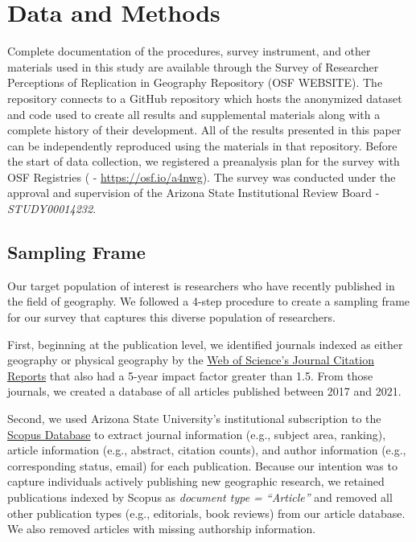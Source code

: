 \documentclass[]{interact}
\theoremstyle{plain}%
\theoremstyle{definition}
\theoremstyle{remark}
\begin{document}
\section*{Data and Methods}
Complete documentation of the procedures, survey instrument, and other materials used in this study are available through the Survey of Researcher Perceptions of Replication in Geography Repository (OSF WEBSITE).
The repository connects to a GitHub repository which hosts the anonymized dataset and code used to create all results and supplemental materials along with a complete history of their development. 
All of the results presented in this paper can be independently reproduced using the materials in that repository.
Before the start of data collection, we registered a preanalysis plan for the survey with OSF Registries (\citet{Kedron_RPl_Survey_PAP} - \url{https://osf.io/a4nwg}). 
The survey was conducted under the approval and supervision of the Arizona State Institutional Review Board - \textit{STUDY00014232}.

\subsection*{Sampling Frame}
Our target population of interest is researchers who have recently published in the field of geography. 
We followed a 4-step procedure to create a sampling frame for our survey that captures this diverse population of researchers. 

First, beginning at the publication level, we identified journals indexed as either geography or physical geography by the \href{https://access.clarivate.com/}{Web of Science's Journal Citation Reports} that also had a 5-year impact factor greater than 1.5.
From those journals, we created a database of all articles published between 2017 and 2021.  

Second, we used Arizona State University's institutional subscription to the \href{https://www.scopus.com/home.uri}{Scopus Database} to extract journal information (e.g., subject area, ranking), article information (e.g., abstract, citation counts), and author information (e.g., corresponding status, email) for each publication. 
Because our intention was to capture individuals actively publishing new geographic research, we retained publications indexed by Scopus as \textit{document type = ``Article''} and removed all other publication types (e.g., editorials, book reviews) from our article database. 
We also removed articles with missing authorship information. 
\end{document}
